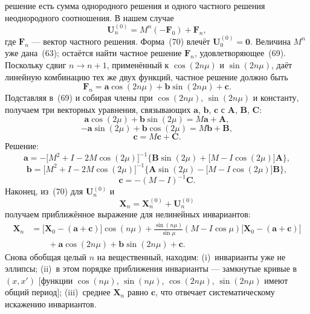 \documentclass[11pt,a4paper]{article}
\begin{document}
решение есть сумма однородного решения и одного частного решения неоднородного
соотношения. В нашем случае
\begin{equation}
\mathbf{U}_n^{(0)}=M^n(-\mathbf{F}_0)+\mathbf{F}_n,
\end{equation}
где $\mathbf{F}_n$ --- вектор частного решения. Форма~(70) влечёт
$\mathbf{U}_0^{(0)}=\mathbf{0}$. Величина $M^n$ уже дана~(63); остаётся найти
частное решение $\mathbf{F}_n$, удовлетворяющее~(69). Поскольку сдвиг
$n\to n+1$, применённый к $\cos(2n\mu)$ и $\sin(2n\mu)$, даёт линейную комбинацию
тех же двух функций, частное решение должно быть
\begin{equation}
\mathbf{F}_n=\mathbf{a}\cos(2n\mu)+\mathbf{b}\sin(2n\mu)+\mathbf{c}.
\end{equation}
Подставляя в~(69) и собирая члены при $\cos(2n\mu)$, $\sin(2n\mu)$ и константу,
получаем три векторных уравнения, связывающих $\mathbf{a}$, $\mathbf{b}$,
$\mathbf{c}$ с $\mathbf{A}$, $\mathbf{B}$, $\mathbf{C}$:
\begin{equation}
\mathbf{a}\cos(2\mu)+\mathbf{b}\sin(2\mu)=M\mathbf{a}+\mathbf{A},
\end{equation}
\begin{equation}
-\mathbf{a}\sin(2\mu)+\mathbf{b}\cos(2\mu)=M\mathbf{b}+\mathbf{B},
\end{equation}
\begin{equation}
\mathbf{c}=M\mathbf{c}+\mathbf{C}.
\end{equation}
Решение:
\begin{equation}
\mathbf{a}=-\bigl[M^2+I-2M\cos(2\mu)\bigr]^{-1}
\bigl\{\mathbf{B}\sin(2\mu)+\bigl[M-I\cos(2\mu)\bigr]\mathbf{A}\bigr\},
\end{equation}
\begin{equation}
\mathbf{b}=\bigl[M^2+I-2M\cos(2\mu)\bigr]^{-1}
\bigl\{\mathbf{A}\sin(2\mu)-\bigl[M-I\cos(2\mu)\bigr]\mathbf{B}\bigr\},
\end{equation}
\begin{equation}
\mathbf{c}=-(M-I)^{-1}\mathbf{C}.
\end{equation}
Наконец, из~(70) для $\mathbf{U}_n^{(0)}$ и
\begin{equation}
\mathbf{X}_n=\mathbf{X}_n^{(0)}+\mathbf{U}_n^{(0)}
\end{equation}
получаем приближённое выражение для нелинейных инвариантов:
\begin{equation}
\begin{aligned}
\mathbf{X}_n
&=\bigl[\mathbf{X}_0-(\mathbf{a}+\mathbf{c})\bigr]\cos(n\mu)
+\frac{\sin(n\mu)}{\sin\mu}(M-I\cos\mu)\bigl[\mathbf{X}_0-(\mathbf{a}+\mathbf{c})\bigr]\\
&\qquad+\mathbf{a}\cos(2n\mu)+\mathbf{b}\sin(2n\mu)+\mathbf{c}.
\end{aligned}
\end{equation}
Снова обобщая целый $n$ на вещественный, находим: (i)~инварианты уже не эллипсы;
(ii)~в этом порядке приближения инварианты --- замкнутые кривые в $(x,x')$
[функции $\cos(n\mu)$, $\sin(n\mu)$, $\cos(2n\mu)$, $\sin(2n\mu)$ имеют общий
период]; (iii)~среднее $\mathbf{X}_n$ равно $\mathbf{c}$, что отвечает
систематическому искажению инвариантов.
\end{document}
